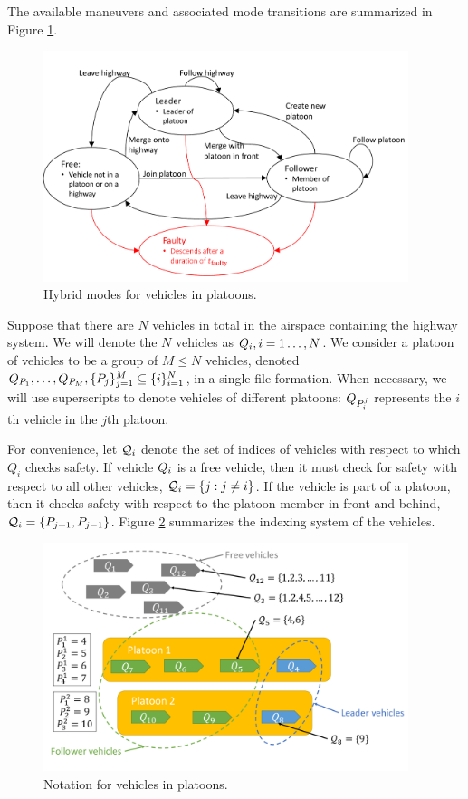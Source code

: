 The available maneuvers and associated mode transitions are summarized in Figure \ref{fig:vehicleModes}.

\begin{figure}
	\centering
	\includegraphics[width=0.95\textwidth]{"fig/vehicleModes"}
	\caption{Hybrid modes for vehicles in platoons.}
	\label{fig:vehicleModes}
\end{figure}

Suppose that there are $N$ vehicles in total in the airspace containing the highway system. We will denote the $N$ vehicles as $Q_{i}, i=1\ldots,N$. We consider a platoon of vehicles to be a group of $M\le N$ vehicles, denoted $Q_{P_1}, \ldots, Q_{P_M}, \{P_j\}_{j=1}^M \subseteq \{i\}_{i=1}^N$, in a single-file formation. When necessary, we will use superscripts to denote vehicles of different platoons: $Q_{P_i^j}$ represents the $i$th vehicle in the $j$th platoon. 

For convenience, let $\mathcal{Q}_{i}$ denote the set of indices of vehicles with respect to which $Q_i$ checks safety. If vehicle $Q_{i}$ is a free vehicle, then it must check for safety with respect to all other vehicles, $\mathcal{Q}_{i} = \{j: j\neq i\}$. If the vehicle is part of a platoon, then it checks safety with respect to the platoon member in front and behind, $\mathcal{Q}_{i} = \{P_{j+1}, P_{j-1}\}$. Figure \ref{fig:vehicleNotation} summarizes the indexing system of the vehicles.

\begin{figure}
	\centering
	\includegraphics[width=0.95\textwidth]{"fig/vehicleNotation"}
	\caption{Notation for vehicles in platoons.}
	\label{fig:vehicleNotation}
\end{figure}

